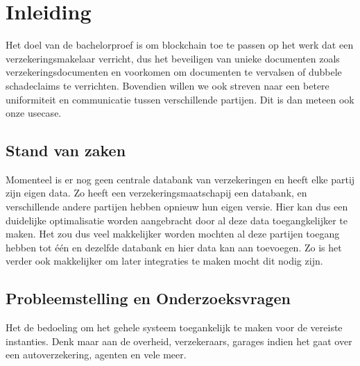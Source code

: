 
\chapter{Inleiding}
\label{ch:inleiding}

Het doel van de bachelorproef is om blockchain toe te passen op het werk dat een verzekeringsmakelaar verricht, dus het beveiligen van unieke documenten zoals verzekeringsdocumenten en voorkomen om documenten te vervalsen of dubbele schadeclaims te verrichten. Bovendien willen we ook streven naar een betere uniformiteit en communicatie tussen verschillende partijen. Dit is dan meteen ook onze usecase.

\section{Stand van zaken}
\label{sec:stand-van-zaken}

Momenteel is er nog geen centrale databank van verzekeringen en heeft elke partij zijn eigen data. Zo heeft een verzekeringsmaatschapij een databank, en verschillende andere partijen hebben opnieuw hun eigen versie. Hier kan dus een duidelijke optimalisatie worden aangebracht door al deze data toegangkelijker te maken. Het zou dus veel makkelijker worden mochten al deze partijen toegang hebben tot één en dezelfde databank en hier data kan aan toevoegen. Zo is het verder ook makkelijker om later integraties te maken mocht dit nodig zijn.


\section{Probleemstelling en Onderzoeksvragen}
\label{sec:onderzoeksvragen}



Het de bedoeling om het gehele systeem toegankelijk te maken voor de vereiste instanties. Denk maar aan de overheid, verzekeraars, garages indien het gaat over een autoverzekering, agenten en vele meer. 

